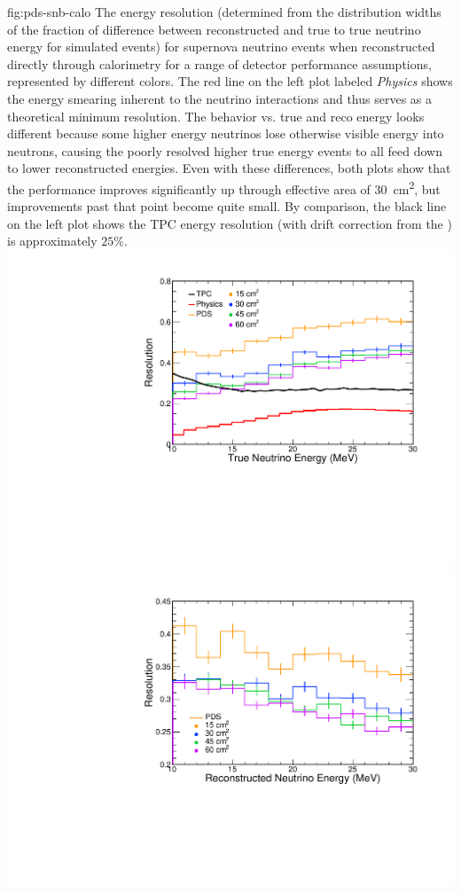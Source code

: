\begin{dunefigure}
{fig:pds-snb-calo}
{The energy resolution (determined from the distribution widths of the fraction of difference between reconstructed and true  to true neutrino energy for simulated events) for supernova neutrino events when reconstructed directly through  calorimetry for a range of detector performance assumptions, represented by different colors. The red line on the left plot labeled {\it Physics} 
shows the energy smearing inherent to the neutrino interactions and thus serves as a theoretical minimum resolution. The behavior vs. true and reco energy looks different because some higher energy neutrinos lose otherwise visible energy into neutrons, causing the poorly resolved higher true energy events to all feed down to lower reconstructed energies. Even with these differences, both plots show that the performance improves significantly up through effective area of \SI{30}{cm^{2}}, but improvements past that point become quite small. By comparison, the black line on the left plot shows the TPC energy resolution (with drift correction from the ) is approximately $25\%$.
}
  \includegraphics[width=0.48\columnwidth]{graphics/pds-snb-res-vs-true.pdf}
  \includegraphics[width=0.48\columnwidth]{graphics/pds-snb-res-vs-reco.pdf}
 \end{dunefigure}

